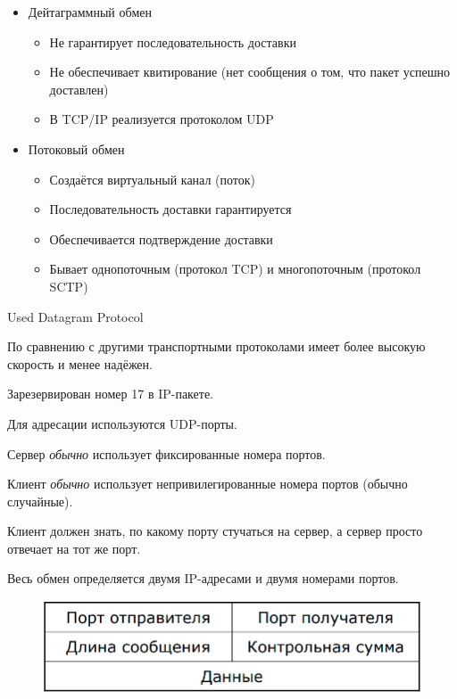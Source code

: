 
\begin{itemize}
    \item Дейтаграммный обмен
    \begin{itemize}
        \item Не гарантирует последовательность доставки
        \item Не обеспечивает квитирование (нет сообщения о том, что пакет успешно доставлен)
        \item В TCP/IP реализуется протоколом UDP
    \end{itemize}
    \item Потоковый обмен
    \begin{itemize}
        \item Создаётся виртуальный канал (поток)
        \item Последовательность доставки гарантируется
        \item Обеспечивается подтверждение доставки
        \item Бывает однопоточным (протокол TCP) и многопоточным (протокол SCTP)
    \end{itemize}
\end{itemize}


Used Datagram Protocol

По сравнению с другими транспортными протоколами имеет более высокую скорость и менее надёжен.

Зарезервирован номер 17 в IP-пакете. 

Для адресации используются UDP-порты.

Сервер {\it обычно} использует фиксированные номера портов.

Клиент {\it обычно} использует непривилегированные номера портов (обычно случайные).

Клиент должен знать, по какому порту стучаться на сервер, а сервер просто отвечает на тот же порт.

Весь обмен определяется двумя IP-адресами и двумя номерами портов.


\begin{figure}[H]
  \centering
  \includegraphics[width=15cm]{images/03/01}
\end{figure}

